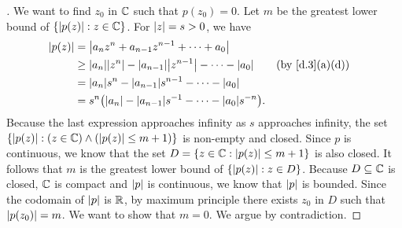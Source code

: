 \begin{proof}[]
  We want to find \(z_0\) in \(\mathbb{C}\) such that \(p(z_0) = 0\).
  Let \(m\) be the greatest lower bound of \(\left\lbrace\left\lvert p(z)\right\rvert : z \in \mathbb{C}\right\rbrace\).
  For \(\left\lvert z\right\rvert = s > 0\), we have
  \begin{align*}
    \abs{p(z)} & = \abs{a_n z^n + a_{n - 1} z^{n - 1} + \cdots + a_0}                                                              \\
               & \geq \abs{a_n} \abs{z^n} - \abs{a_{n - 1}} \abs{z^{n - 1}} - \cdots - \abs{a_0} &  & \text{(by \cref{d.3}(a)(d))} \\
               & = \abs{a_n} s^n - \abs{a_{n - 1}} s^{n - 1} - \cdots - \abs{a_0}                                                  \\
               & = s^{n} \pa{\abs{a_n} - \abs{a_{n - 1}} s^{-1} - \cdots - \abs{a_0} s^{-n}}.
  \end{align*}
  Because the last expression approaches infinity as \(s\) approaches infinity, the set \(\left\lbrace\left\lvert p(z)\right\rvert : (z \in \mathbb{C}) \land (\left\lvert p(z)\right\rvert \leq m + 1)\right\rbrace\) is non-empty and closed.
  Since \(p\) is continuous, we know that the set \(D = \left\lbrace z \in \mathbb{C} : \left\lvert p(z)\right\rvert \leq m + 1\right\rbrace\) is also closed.
  It follows that \(m\) is the greatest lower bound of \(\left\lbrace\left\lvert p(z)\right\rvert : z \in D\right\rbrace\).
  Because \(D \subseteq \mathbb{C}\) is closed, \(\mathbb{C}\) is compact and \(\left\lvert p\right\rvert\) is continuous, we know that \(\left\lvert p\right\rvert\) is bounded.
  Since the codomain of \(\left\lvert p\right\rvert\) is \(\mathbb{R}\), by maximum principle there exists \(z_0\) in \(D\) such that \(\left\lvert p(z_0)\right\rvert = m\).
  We want to show that \(m = 0\).
  We argue by contradiction.


\end{proof}
